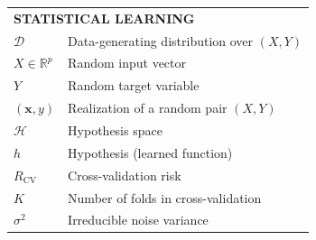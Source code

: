 \begin{longtable}{p{} p{}}
\multicolumn{2}{l}{\textbf{STATISTICAL LEARNING}} \\ [0.3em]
$\mathcal{D}$ & Data-generating distribution over $(X, Y)$ \\
$X \in \mathbb{R}^p$ & Random input vector \\
$Y$ & Random target variable \\
$(\mathbf{x}, y)$ & Realization of a random pair $(X, Y)$ \\
$\mathcal{H}$ & Hypothesis space \\
$h$ & Hypothesis (learned function) \\
$R_{\mathrm{CV}}$ & Cross-validation risk \\
$K$ & Number of folds in cross-validation \\
$\sigma^2$ & Irreducible noise variance
\end{longtable}
